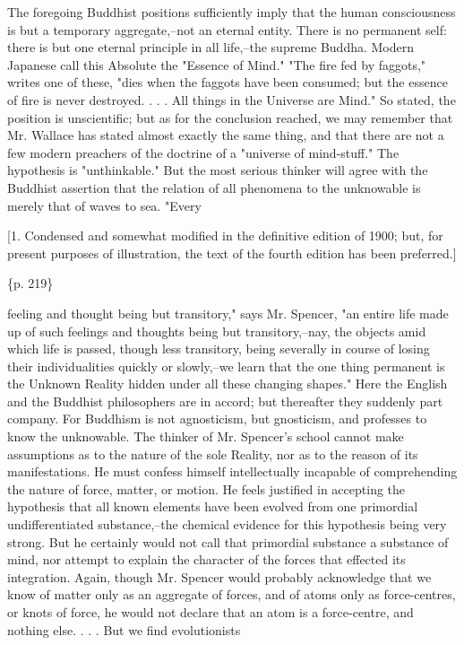 The foregoing Buddhist positions sufficiently imply that the human consciousness is but a temporary aggregate,--not an eternal entity. There is no permanent self: there is but one eternal principle in all life,--the supreme Buddha. Modern Japanese call this Absolute the "Essence of Mind." "The fire fed by faggots," writes one of these, "dies when the faggots have been consumed; but the essence of fire is never destroyed. . . . All things in the Universe are Mind." So stated, the position is unscientific; but as for the conclusion reached, we may remember that Mr. Wallace has stated almost exactly the same thing, and that there are not a few modern preachers of the doctrine of a "universe of mind-stuff." The hypothesis is "unthinkable." But the most serious thinker will agree with the Buddhist assertion that the relation of all phenomena to the unknowable is merely that of waves to sea. "Every

[1. Condensed and somewhat modified in the definitive edition of 1900; but, for present purposes of illustration, the text of the fourth edition has been preferred.]

\{p. 219\}

feeling and thought being but transitory," says Mr. Spencer, "an entire life made up of such feelings and thoughts being but transitory,--nay, the objects amid which life is passed, though less transitory, being severally in course of losing their individualities quickly or slowly,--we learn that the one thing permanent is the Unknown Reality hidden under all these changing shapes." Here the English and the Buddhist philosophers are in accord; but thereafter they suddenly part company. For Buddhism is not agnosticism, but gnosticism, and professes to know the unknowable. The thinker of Mr. Spencer's school cannot make assumptions as to the nature of the sole Reality, nor as to the reason of its manifestations. He must confess himself intellectually incapable of comprehending the nature of force, matter, or motion. He feels justified in accepting the hypothesis that all known elements have been evolved from one primordial undifferentiated substance,--the chemical evidence for this hypothesis being very strong. But he certainly would not call that primordial substance a substance of mind, nor attempt to explain the character of the forces that effected its integration. Again, though Mr. Spencer would probably acknowledge that we know of matter only as an aggregate of forces, and of atoms only as force-centres, or knots of force, he would not declare that an atom is a force-centre, and nothing else. . . . But we find evolutionists

